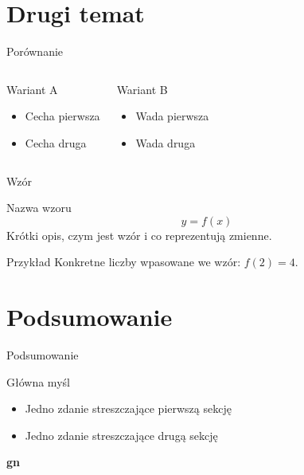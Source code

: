 \section{Drugi temat}

\begin{frame}{Porównanie}
  \begin{columns}
      \begin{block}{Wariant A}
        \begin{itemize}
          \item Cecha pierwsza
          \item Cecha druga
        \end{itemize}
      \end{block}
      \begin{alertblock}{Wariant B}
        \begin{itemize}
          \item Wada pierwsza
          \item Wada druga
        \end{itemize}
      \end{alertblock}
  \end{columns}
\end{frame}

\begin{frame}{Wzór}
  \begin{block}{Nazwa wzoru}
    \[
      y = f(x)
    \]
    Krótki opis, czym jest wzór i co reprezentują zmienne.
  \end{block}
  \vspace{0.3cm}
  \begin{exampleblock}{Przykład}
    Konkretne liczby wpasowane we wzór: $f(2) = 4$.
  \end{exampleblock}
\end{frame}

\section{Podsumowanie}

\begin{frame}{Podsumowanie}
  \begin{block}{Główna myśl}
    \begin{itemize}
      \item Jedno zdanie streszczające pierwszą sekcję
      \item Jedno zdanie streszczające drugą sekcję
    \end{itemize}
  \end{block}
\end{frame}

\begin{frame}[plain]
  \begin{center}
    \vfill
    {\Huge\bfseries\color{stplwhite} gn}
    \vfill
  \end{center}
\end{frame}


